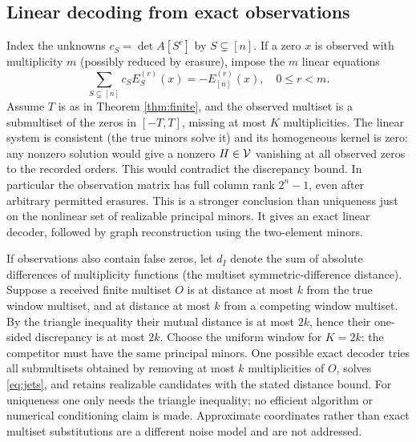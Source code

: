 \documentclass[11pt]{article}
\theoremstyle{definition}\newtheorem{definition}[theorem]{Definition}
\begin{document}
\subsection{Linear decoding from exact observations}
Index the unknowns $c_S=\det A[S^c]$ by $S\subsetneq[n]$. If a zero $x$ is observed with multiplicity $m$ (possibly reduced by erasure), impose the $m$ linear equations
\begin{equation}\label{eq:jets}
             \sum_{S\subsetneq[n]}c_S E_S^{(r)}(x)=-E_{[n]}^{(r)}(x),
             \quad 0\le r<m.
\end{equation}
Assume $T$ is as in Theorem \ref{thm:finite}, and the observed multiset is a submultiset of the zeros in $[-T,T]$, missing at most $K$ multiplicities. The linear system is consistent (the true minors solve it) and its homogeneous kernel is zero: any nonzero solution would give a nonzero $H\in\mathcal V$ vanishing at all observed zeros to the recorded orders. This would contradict the discrepancy bound. In particular the observation matrix has full column rank $2^n-1$, even after arbitrary permitted erasures. This is a stronger conclusion than uniqueness just on the nonlinear set of realizable principal minors. It gives an exact linear decoder, followed by graph reconstruction using the two-element minors.

If observations also contain false zeros, let $d_I$ denote the sum of absolute differences of multiplicity functions (the multiset symmetric-difference distance). Suppose a received finite multiset $O$ is at distance at most $k$ from the true window multiset, and at distance at most $k$ from a competing window multiset. By the triangle inequality their mutual distance is at most $2k$, hence their one-sided discrepancy is at most $2k$. Choose the uniform window for $K=2k$: the competitor must have the same principal minors. One possible exact decoder tries all submultisets obtained by removing at most $k$ multiplicities of $O$, solves \eqref{eq:jets}, and retains realizable candidates with the stated distance bound. For uniqueness one only needs the triangle inequality; no efficient algorithm or numerical conditioning claim is made. Approximate coordinates rather than exact multiset substitutions are a different noise model and are not addressed.
\end{document}
